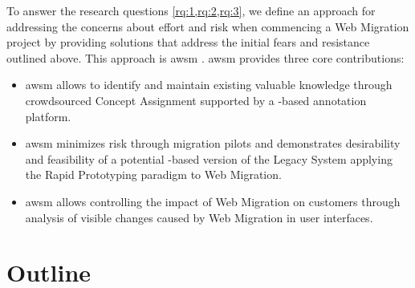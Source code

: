 To answer the research questions \cref{rq:1,rq:2,rq:3}, we define an approach for addressing the concerns about effort and risk when commencing a \gls{Web Migration} project by providing solutions that address the initial fears and resistance outlined above.
This approach is \gls{awsm} \autocite{Heil2016AWSM}.
\gls{awsm} provides three core contributions:

\begin{itemize}
\tightlist
\item
  \gls{awsm} allows to identify and maintain existing valuable knowledge through crowdsourced \gls{Concept Assignment} supported by a -based annotation platform.
\item
  \gls{awsm} minimizes risk through migration pilots and demonstrates desirability and feasibility of a potential -based version of the \gls{Legacy System} applying the \gls{Rapid Prototyping} paradigm to \gls{Web Migration}.
\item
  \gls{awsm} allows controlling the impact of \gls{Web Migration} on customers through analysis of visible changes caused by \gls{Web Migration} in user interfaces.
\end{itemize}

\vspace{-15pt}
\hypertarget{structure-of-this-thesis}{%
\section{Outline}\label{structure-of-this-thesis}}
\vspace{15pt}


